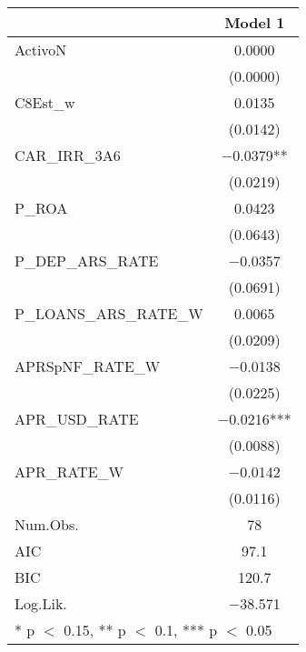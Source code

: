 \begin{table}
\centering
\begin{tabular}[t]{lc}
\toprule
  & Model 1\\
\midrule
ActivoN & \num{0.0000}\\
 & (\num{0.0000})\\
C8Est\_w & \num{0.0135}\\
 & (\num{0.0142})\\
CAR\_IRR\_3A6 & \num{-0.0379}**\\
 & (\num{0.0219})\\
P\_ROA & \num{0.0423}\\
 & (\num{0.0643})\\
P\_DEP\_ARS\_RATE & \num{-0.0357}\\
 & (\num{0.0691})\\
P\_LOANS\_ARS\_RATE\_W & \num{0.0065}\\
 & (\num{0.0209})\\
APRSpNF\_RATE\_W & \num{-0.0138}\\
 & (\num{0.0225})\\
APR\_USD\_RATE & \num{-0.0216}***\\
 & (\num{0.0088})\\
APR\_RATE\_W & \num{-0.0142}\\
 & (\num{0.0116})\\
\midrule
Num.Obs. & \num{78}\\
AIC & \num{97.1}\\
BIC & \num{120.7}\\
Log.Lik. & \num{-38.571}\\
\bottomrule
\multicolumn{2}{l}{\rule{0pt}{1em}* p $<$ 0.15, ** p $<$ 0.1, *** p $<$ 0.05}\\
\end{tabular}
\end{table}
